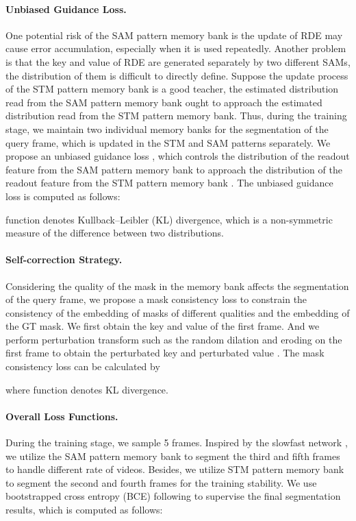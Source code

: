 \documentclass[10pt,twocolumn,letterpaper]{article}
\begin{document}
\paragraph{Unbiased Guidance Loss.}
One potential risk of the SAM pattern memory bank is the update of RDE may cause error accumulation, especially when it is used repeatedly. Another problem is that the key and value of RDE are generated separately by two different SAMs, the distribution of them is difficult to directly define. Suppose the update process of the STM pattern memory bank is a good teacher, the estimated distribution read from the SAM pattern memory bank ought to approach the estimated distribution read from the STM pattern memory bank. 
Thus, during the training stage, we maintain two individual memory banks for the segmentation of the query frame, which is updated in the STM and SAM patterns separately.
We propose an unbiased guidance loss , which controls the distribution of the readout feature from the SAM pattern memory bank  to approach the distribution of the readout feature from the STM pattern memory bank . The unbiased guidance loss  is computed as follows:

 function denotes Kullback–Leibler (KL) divergence, which is a non-symmetric measure of the difference between two distributions.




\paragraph{Self-correction Strategy.}
Considering the quality of the mask in the memory bank affects the segmentation of the query frame, we propose a mask consistency loss   to constrain the consistency of the embedding of masks of different qualities and the embedding of the GT mask.  
We first obtain the key  and value  of the first frame. And we perform perturbation transform such as the random dilation and eroding on the first frame to obtain the perturbated key  and perturbated value . The mask consistency loss  can be calculated by 

where  function denotes KL divergence. 


\paragraph{Overall Loss Functions.}
During the training stage, we sample 5 frames. Inspired by the slowfast network \cite{feichtenhofer2019slowfast}, we utilize the SAM pattern memory bank to segment the third and fifth frames to handle different rate of videos. Besides, we utilize STM pattern memory bank to segment the second and fourth frames for the training stability.  We use bootstrapped cross entropy (BCE) following \cite{cheng2021modular} to supervise the final segmentation results, which is computed as follows:
\end{document}
